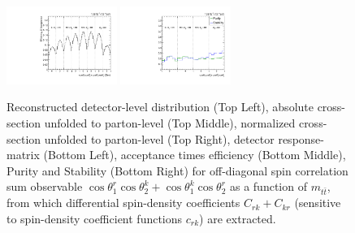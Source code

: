 \begin{figure}[htb]
\begin{center}
 \includegraphics[width=0.32\textwidth]{fig_fullRun2UL/unfolding/combined/TotEff_c_Prk_mttbar.pdf}
 \includegraphics[width=0.32\textwidth]{fig_fullRun2UL/unfolding/combined/PurStab_c_Prk_mttbar.pdf} \\
\caption{Reconstructed detector-level distribution (Top Left), absolute cross-section unfolded to parton-level (Top Middle), normalized cross-section unfolded to parton-level (Top Right), detector response-matrix (Bottom Left), acceptance times efficiency (Bottom Middle), Purity and Stability (Bottom Right) for off-diagonal spin correlation sum observable $\cos\theta_{1}^{r}\cos\theta_{2}^{k}+\cos\theta_{1}^{k}\cos\theta_{2}^{r}$ as a function of $m_{t\bar{t}}$, from which differential spin-density coefficients $C_{rk}+C_{kr}$ (sensitive to spin-density coefficient functions $c_{r k}$) are extracted.}
\label{fig:c_Prk_mttbar}
\end{center}
\end{figure}
\clearpage
